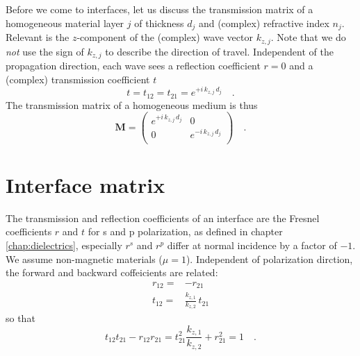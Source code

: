 Before we come to interfaces, let us discuss the transmission matrix of a homogeneous material layer $j$ of thickness $d_j$ and (complex) refractive index $n_j$. Relevant is the $z$-component of the (complex) wave vector $k_{z,j}$. Note that we do \emph{not} use the sign of  $k_{z,j}$ to describe the direction of travel.
Independent of the propagation direction, each wave sees a reflection coefficient $r=0$ and a (complex) transmission coefficient $t$
\begin{equation}
t = t_{12} = t_{21} = e^{+ i \, k_{z,j} \, d_j } \quad . 
\end{equation}
The transmission matrix of a homogeneous medium is thus
\begin{equation}
\mathbf{M} = 
\begin{pmatrix}
e^{+i \, k_{z,j} \, d_j } & 0 \\0 & e^{-i \, k_{z,j} \, d_j } \\
\end{pmatrix} \quad . 
\label{eq:6_M_prob}
\end{equation}


\section{Interface matrix}

The transmission and reflection coefficients of an interface are the Fresnel coefficients $r$ and $t$ for s and p polarization, as defined in chapter \ref{chap:dielectrics}, especially  $r^s$ and $r^p$ differ at normal incidence by a factor of $-1$. We assume non-magnetic materials ($\mu = 1$). Independent of polarization dirction, the forward  and backward coffeicients are related:
\begin{align}
 r_{12} = &   - r_{21}\\
 t_{12} = &   \frac{k_{z,1}}{k_{z,2}}  \,  t_{21}
\end{align}
so that
\begin{equation}
  t_{12} t_{21} - r_{12} r_{21} = t_{21}^2 \frac{k_{z,1}}{k_{z,2}} + r_{21}^2 = 1 \quad . 
  \end{equation}


